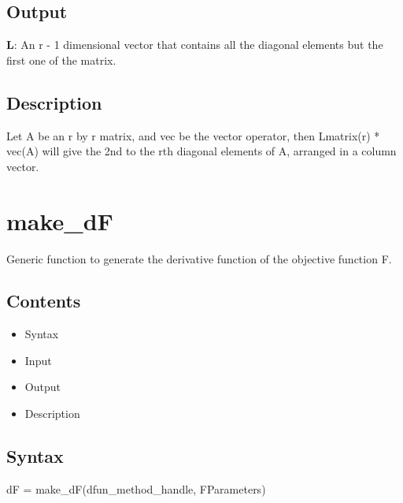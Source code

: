 \documentclass[a4paper,11pt,openany]{memoir}
\begin{document}
\subsection*{Output}

\begin{par}
\textbf{L}: An r - 1 dimensional vector that contains all the diagonal elements but the first one of the matrix.
\end{par} \vspace{1em}


\subsection*{Description}

\begin{par}
Let A be an r by r matrix, and vec be the vector operator, then Lmatrix(r) * vec(A) will give the 2nd to the rth diagonal elements of A, arranged in a column vector.
\end{par} \vspace{1em}

\newpage

\rmfamily
\color{black}\section{make\_dF}

\begin{par}
Generic function to generate the derivative function of the objective function F.
\end{par} \vspace{1em}

\subsection*{Contents}

\begin{itemize}
\setlength{\itemsep}{-1ex}
   \item Syntax
   \item Input
   \item Output
   \item Description
\end{itemize}


\subsection*{Syntax}

\begin{par}
dF = make\_dF(dfun\_method\_handle, FParameters)
\end{par} \vspace{1em}
\end{document}

